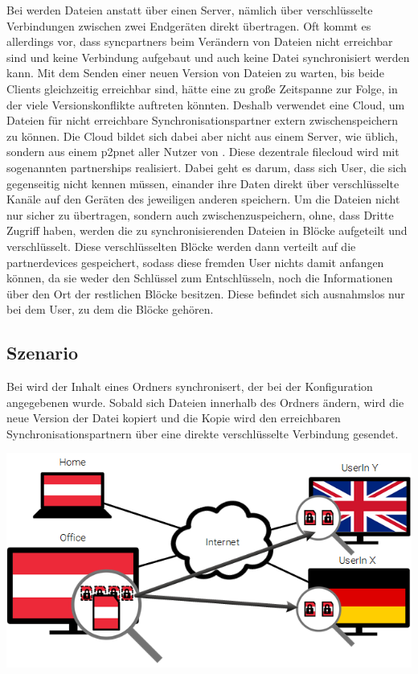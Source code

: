 Bei \sblit werden Dateien anstatt über einen Server, nämlich über verschlüsselte
Verbindungen zwischen zwei Endgeräten direkt übertragen.
Oft kommt es allerdings vor, dass \glspl{syncpartner} beim Verändern von
Dateien nicht erreichbar sind und keine Verbindung aufgebaut und auch
keine Datei synchronisiert werden kann.
Mit dem Senden einer neuen Version von Dateien zu warten,
bis beide Clients gleichzeitig erreichbar sind, hätte eine zu große Zeitspanne
zur Folge, in der viele Versionskonflikte auftreten könnten.
Deshalb verwendet \sblit eine Cloud, um Dateien für nicht erreichbare
Synchronisationspartner extern zwischenspeichern zu können. Die Cloud bildet
sich dabei aber nicht aus einem Server, wie üblich, sondern aus einem \gls{p2pnet}
aller Nutzer von \sblit. Diese dezentrale \gls{filecloud} wird
mit sogenannten \glspl{partnership} realisiert. Dabei geht es darum, dass sich
User, die sich gegenseitig nicht kennen müssen, einander ihre Daten direkt über
verschlüsselte Kanäle auf den Geräten des jeweiligen anderen speichern.
Um die Dateien nicht nur sicher zu übertragen, sondern auch zwischenzuspeichern,
ohne, dass Dritte Zugriff haben, werden die zu
synchronisierenden Dateien in Blöcke aufgeteilt und verschlüsselt. Diese
verschlüsselten Blöcke werden dann verteilt auf die \glspl{partnerdevice} gespeichert,
sodass diese fremden User nichts damit anfangen können, da sie weder den
Schlüssel zum Entschlüsseln, noch die Informationen über den Ort der restlichen
Blöcke besitzen. Diese befindet sich ausnahmslos nur bei dem User, zu dem die
Blöcke gehören.

\subsection{Szenario}
Bei \sblit wird der Inhalt eines Ordners synchronisert, der bei der
Konfiguration angegebenen wurde. Sobald sich Dateien innerhalb des Ordners
ändern, wird die neue Version der Datei kopiert und die Kopie wird den
erreichbaren Synchronisationspartnern über eine direkte verschlüsselte Verbindung
gesendet.

\includegraphics[]{images/sblit_1}


